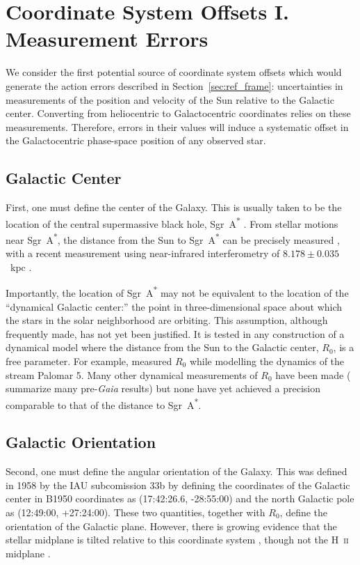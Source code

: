 \documentclass[twocolumn]{aastex62}
\begin{document}
\section{Coordinate System Offsets I. Measurement Errors} \label{sec:mes_err}
We consider the first potential source of coordinate system offsets which
would generate the action errors described in Section~\ref{sec:ref_frame}:
uncertainties in measurements of the position and velocity of the Sun relative
to the Galactic center. Converting from heliocentric to Galactocentric
coordinates relies on these measurements. Therefore, errors in their values
will induce a systematic offset in the Galactocentric phase-space position of
any observed star.

\subsection{Galactic Center}
First, one must define the center of the Galaxy. This is usually taken to be
the location of the central supermassive black hole, Sgr~A\textsuperscript{*}
\citep[e.g.][]{2004ApJ...616..872R}. From stellar motions near
Sgr~A\textsuperscript{*}, the distance from the Sun to
Sgr~A\textsuperscript{*} can be precisely measured \citep{2009ApJ...692.1075G,
2018AA...615L..15G}, with a recent measurement using near-infrared
interferometry of $8.178 \pm 0.035$~kpc \citep{2019arXiv190405721A}.

Importantly, the location of Sgr~A\textsuperscript{*} may not be equivalent to
the location of the ``dynamical Galactic center:'' the point in
three-dimensional space about which the stars in the solar neighborhood are
orbiting. This assumption, although frequently made, has not yet been
justified. It is tested in any construction of a  dynamical model where the
distance from the Sun to the Galactic center, $R_0$, is a free parameter. For
example, \citet{2015ApJ...803...80K} measured $R_0$ while modelling the
dynamics of the stream Palomar 5. Many other dynamical measurements of $R_0$
have been made (\citealt{2016ARAA..54..529B} summarize many pre-{\em Gaia}
results) but none have yet achieved a precision comparable to that of the
distance to Sgr~A\textsuperscript{*}.

\subsection{Galactic Orientation}
Second, one must define the angular orientation of the Galaxy. This was
defined in 1958 by the IAU subcomission 33b \citep{1960MNRAS.121..123B} by
defining the coordinates of the Galactic center in B1950 coordinates as
(17:42:26.6, -28:55:00) and the north Galactic pole as (12:49:00, +27:24:00).
These two quantities, together with $R_0$, define the orientation of the
Galactic plane. However, there is growing evidence that the stellar midplane
is tilted relative to this coordinate system \citep{2014ApJ...797...53G,
2016ARAA..54..529B}, though not the H~\textsc{ii} midplane
\citep{2019ApJ...871..145A}.
\end{document}
